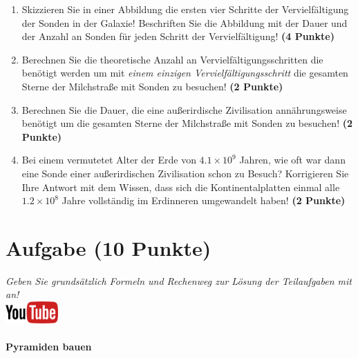 \documentclass[a4paper, 9pt]{scrartcl}\usepackage[]{graphicx}\usepackage[]{xcolor}
\begin{document}
\begin{enumerate}
\item Skizzieren Sie in einer Abbildung die ersten vier Schritte der
  Vervielf{\"a}ltigung der Sonden in der Galaxie! Beschriften Sie die Abbildung
  mit der Dauer und der Anzahl an Sonden f{\"u}r jeden Schritt der Vervielf{\"a}ltigung! \textbf{(4 Punkte)}
\item Berechnen Sie die theoretische Anzahl an Vervielf{\"a}ltigungsschritten die
  ben{\"o}tigt werden um mit \textit{einem einzigen Vervielf{\"a}ltigungsschritt} die
  gesamten Sterne der Milchstra{\ss}e mit Sonden zu besuchen! \textbf{(2 Punkte)}
\item Berechnen Sie die Dauer, die eine au{\ss}erirdische Zivilisation
  ann{\"a}hrungsweise ben{\"o}tigt um die gesamten Sterne der Milchstra{\ss}e mit
  Sonden zu besuchen! \textbf{(2 Punkte)}
\item Bei einem vermutetet Alter der Erde von $\ensuremath{4.1\times 10^{9}}$ Jahren,
  wie oft war dann eine Sonde einer au{\ss}erirdischen Zivilisation schon zu
  Besuch? Korrigieren Sie Ihre Antwort mit dem Wissen, dass sich die
  Kontinentalplatten einmal alle $\ensuremath{1.2\times 10^{8}}$ Jahre vollst{\"a}ndig im
  Erdinneren umgewandelt haben! \textbf{(2 Punkte)}
\end{enumerate}


 
\clearpage

\section{Aufgabe \hfill (10 Punkte)}

\textit{Geben Sie grunds{\"a}tzlich Formeln und Rechenweg zur L{\"o}sung der
  Teilaufgaben mit an!} \\[1Ex]

\hfill\href{https://youtu.be/tDgr6fpkkYA}{\includegraphics[width =
  2cm]{img/youtube}} %
\hspace{2Ex}

\paragraph{Pyramiden bauen}
\end{document}
